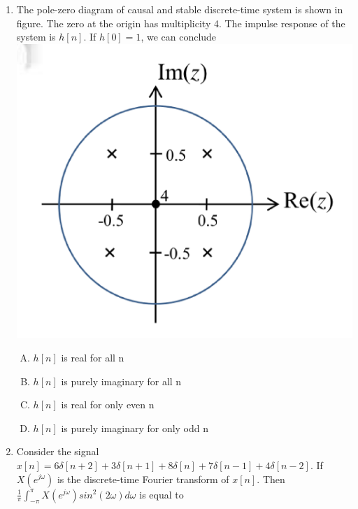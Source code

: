 \documentclass[journal,12pt,twocolumn]{IEEEtran}
\begin{document}
\begin{enumerate}
\item The pole-zero diagram of causal and stable discrete-time system is shown in figure. The zero at the origin has multiplicity 4. The impulse response of the system is $h[n]$. If $h[0]=1$, we can conclude\\
\includegraphics[scale=0.4]{fig16.eps}
\begin{enumerate}[(A)]

\setlength\itemsep{1em}

\item $h[n]$ is real for all n
\item $h[n]$ is purely imaginary for all n
\item $h[n]$ is real for only even n
\item $h[n]$ is purely imaginary for only odd n
\end{enumerate}





\item Consider the signal $x[n]=6\delta [n+2]+3\delta [n+1]+8\delta[n]+7\delta[n-1]+4\delta[n-2]$. If $X(e^{j\omega})$ is the discrete-time Fourier transform of $x[n]$. Then $\frac{1}{\pi}\int_{-\pi}^{\pi}X(e^{j\omega}) sin^{2}(2\omega)d\omega$ is equal to \underline{\hspace{2cm}}


\end{enumerate}
\end{document}
